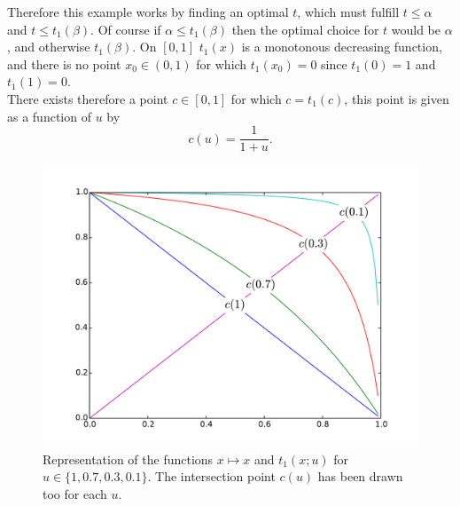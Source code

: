 \documentclass[10pt, a4paper]{amsart}
\begin{document}
Therefore this example works by finding an optimal $t$, which must fulfill $t \leq \alpha$ and $t\leq t_1(\beta)$. Of course if $\alpha \leq t_{1}(\beta)$ then the optimal choice for $t$ would be $\alpha$, and otherwise $t_{1}(\beta)$. On $[0,1]$ $t_{1}(x)$ is a monotonous decreasing function, and there is no point $x_{0}\in (0,1)$ for which $t_{1}(x_{0}) = 0$ since $t_{1}(0) = 1$ and $t_{1}(1) = 0$. \\
There exists therefore a point $c\in [0,1]$ for which $c = t_{1}(c)$, this point is given as a function of $u$ by 
$$
c(u) = \dfrac{1}{1+u}.
$$
\begin{figure}[h]
\centering
\includegraphics[scale=.6]{images/alpha_t1.pdf}
\caption{Representation of the functions $x\mapsto x$ and $t_{1}(x;u)$ for $u\in\{1,0.7,0.3,0.1\}$. The intersection point $c(u)$ has been drawn too for each $u$.}
\label{fig:alpha_t1}
\end{figure}
\end{document}
